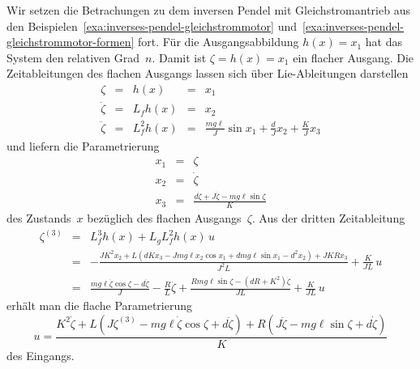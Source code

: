 \begin{example}
\label{exa:inverses-pendel-gleichstrommotor-flache-param}Wir setzen
die Betrachungen zu dem inversen Pendel mit Gleichstromantrieb aus
den Beispielen~\ref{exa:inverses-pendel-gleichstrommotor} und~\ref{exa:inverses-pendel-gleichstrommotor-formen}
fort. Für die Ausgangsabbildung $h(x)=x_{1}$ hat das System den relativen
Grad~$n$. Damit ist $\zeta=h(x)=x_{1}$ ein flacher Ausgang. Die
Zeitableitungen des flachen Ausgangs lassen sich über Lie-Ableitungen
darstellen
\[
\begin{array}{cclcl}
\zeta & = & h(x) & = & x_{1}\\
\dot{\zeta} & = & L_{f}h(x) & = & x_{2}\\
\ddot{\zeta} & = & L_{f}^{2}h(x) & = & \frac{mg\ell}{J}\sin x_{1}+\frac{d}{J}x_{2}+\frac{K}{J}x_{3}
\end{array}
\]
und liefern die Parametrierung
\[
\begin{array}{lcl}
x_{1} & = & \zeta\\
x_{2} & = & \dot{\zeta}\\
x_{3} & = & \frac{d\dot{\zeta}+J\ddot{\zeta}-mg\ell\sin\zeta}{K}
\end{array}
\]
des Zustands~$x$ bezüglich des flachen Ausgangs~$\zeta$. Aus der
dritten Zeitableitung
\[
\begin{array}{lcl}
\zeta^{(3)} & = & L_{f}^{3}h(x)+L_{g}L_{f}^{2}h(x)\,u\\
 & = & -\frac{JK^{2}x_{2}+L\left(dKx_{3}-Jmg\ell x_{2}\cos x_{1}+dmg\ell\sin x_{1}-d^{2}x_{2}\right)+JKRx_{3}}{J^{2}L}+\frac{K}{JL}\,u\\
 & = & \frac{mg\ell\dot{\zeta}\cos\zeta-d\ddot{\zeta}}{J}-\frac{R}{L}\ddot{\zeta}+\frac{Rmg\ell\sin\zeta-(dR+K^{2})\dot{\zeta}}{JL}+\frac{K}{JL}\,u
\end{array}
\]
erhält man die flache Parametrierung
\[
u=\frac{K^{2}\dot{\zeta}+L\left(J\zeta^{(3)}-mg\ell\dot{\zeta}\cos\zeta+d\ddot{\zeta}\right)+R\left(J\ddot{\zeta}-mg\ell\sin\zeta+d\dot{\zeta}\right)}{K}
\]
des Eingangs.
\end{example}

